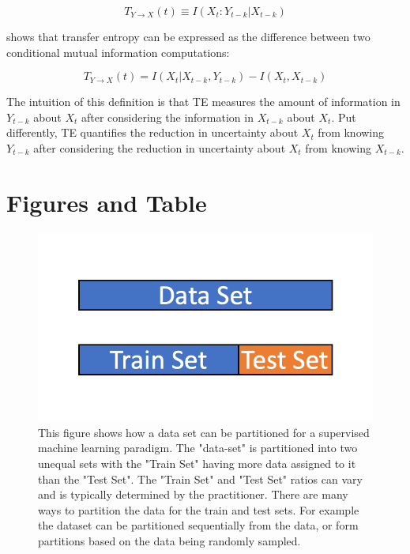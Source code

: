 \begin{equation}
T_{Y \rightarrow X} (t) \equiv I(X_t: Y_{t-k} |  X_{t-k})
\end{equation}

\noindent \cite{Kaiser2002} shows that transfer entropy can be expressed as the difference between two conditional mutual information computations: 

\begin{equation}  \label{eq:TE-MI-Diff}
T_{Y \rightarrow X}(t) = I(X_t | X_{t-k}, Y_{t-k}) -  I(X_t,  X_{t-k}) 
 \end{equation} 

The intuition of this definition is that TE measures the amount of information in \(Y_{t-k}\) about \(X_t\) after  considering the information in \(X_{t-k}\) about \(X_t\). Put differently, TE quantifies the reduction in uncertainty about \(X_t\) from knowing \(Y_{t-k}\) after considering the reduction in uncertainty about \(X_t\) from knowing \(X_{t-k}\).

\clearpage

\section{Figures and Table}

\begin{figure}[!htb]
    \centering
      \centering
      \includegraphics[width=\textwidth]{figures/ppt/TrainTestSplit.png}
    \caption{
      This figure shows how a data set can be partitioned for a supervised machine learning paradigm. The "data-set" is partitioned into two unequal sets with the "Train Set" having more data assigned to it than the "Test Set".  The "Train Set" and "Test Set" ratios can vary and is typically determined by the practitioner. There are many ways to partition the data for the train and test sets. For example the dataset can be partitioned sequentially from the data, or form partitions based on the data being randomly sampled.
      }
\label{fig:TrainTestSplit}

  \end{figure}



